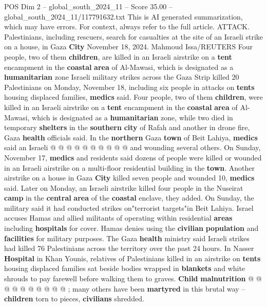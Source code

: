 \begin{textsample}{POS Dim 2 – global\_south\_2024\_11 – Score 35.00 – global\_south\_2024\_11/117791632.txt}  \label{ex:f2_pos_241}
This is AI generated summarization, which may have errors.
For context, always refer to the full article.
ATTACK.
Palestinians, including rescuers, search for casualties at the site of an Israeli strike on a house, in Gaza \textbf{City} November 18, 2024.
Mahmoud Issa/REUTERS Four people, two of them \textbf{children}, are killed in an Israeli airstrike on a \textbf{tent} encampment in the \textbf{coastal} \textbf{area} of Al-Mawasi, which is designated as a \textbf{humanitarian} zone Israeli military strikes across the Gaza Strip killed 20 Palestinians on Monday, November 18, including six people in attacks on \textbf{tents} housing displaced families, \textbf{medics} said.
Four people, two of them \textbf{children}, were killed in an Israeli airstrike on a \textbf{tent} encampment in the \textbf{coastal} \textbf{area} of Al-Mawasi, which is designated as a \textbf{humanitarian} zone, while two died in temporary \textbf{shelters} in the \textbf{southern} \textbf{city} of Rafah and another in drone fire, Gaza \textbf{health} officials said.
In the \textbf{northern} Gaza \textbf{town} of Beit Lahiya, \textbf{medics} said an Israeli @ @ @ @ @ @ @ @ @ @ and wounding several others.
On Sunday, November 17, \textbf{medics} and residents said dozens of people were killed or wounded in an Israeli airstrike on a multi-floor residential building in the \textbf{town}.
Another airstrike on a house in Gaza \textbf{City} killed seven people and wounded 10, \textbf{medics} said.
Later on Monday, an Israeli airstrike killed four people in the Nuseirat \textbf{camp} in the \textbf{central} \textbf{area} of the \textbf{coastal} enclave, they added.
On Sunday, the military said it had conducted strikes on"terrorist targets"in Beit Lahiya.
Israel accuses Hamas and allied militants of operating within residential \textbf{areas} including \textbf{hospitals} for cover.
Hamas denies using the \textbf{civilian} \textbf{population} and \textbf{facilities} for military purposes.
The Gaza \textbf{health} ministry said Israeli strikes had killed 76 Palestinians across the territory over the past 24 hours.
In Nasser \textbf{Hospital} in Khan Younis, relatives of Palestinians killed in an airstrike on \textbf{tents} housing displaced families sat beside bodies wrapped in \textbf{blankets} and white shrouds to pay farewell before walking them to graves. \textbf{Child} \textbf{malnutrition} @ @ @ @ @ @ @ @ @ @ ; many others have been \textbf{martyred} in this brutal way -- \textbf{children} torn to pieces, \textbf{civilians} shredded.

\end{textsample}

